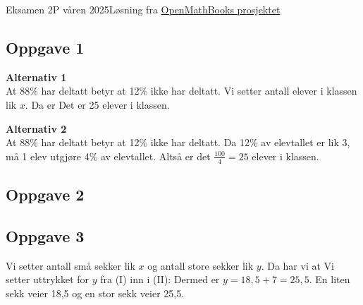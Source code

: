





{\Large Eksamen 2P våren 2025\hfill {\footnotesize Løsning fra \color{blue} \href{https://sindreheggen.wordpress.com/}{OpenMathBooks prosjektet}}}	
\subsection*{Oppgave 1}
\textbf{Alternativ 1} \\
At 88\% har deltatt betyr at 12\% ikke har deltatt. Vi setter antall elever i klassen lik $x$. Da er
Det er 25 elever i klassen.\os

\textbf{Alternativ 2} \\
At 88\% har deltatt betyr at 12\% ikke har deltatt. Da 12\% av elevtallet er lik 3, må 1 elev utgjøre 4\% av elevtallet. Altså er det $\frac{100}{4}=25$ elever i klassen.

\subsection*{Oppgave 2}
\subsection*{Oppgave 3}
Vi setter antall små sekker lik $x$ og antall store sekker lik $y$.
Da har vi at
Vi setter uttrykket for $y$ fra (I) inn i (II):
Dermed er $y=18,5+7=25,5$. En liten sekk veier 18,5 og en stor sekk veier 25,5.
